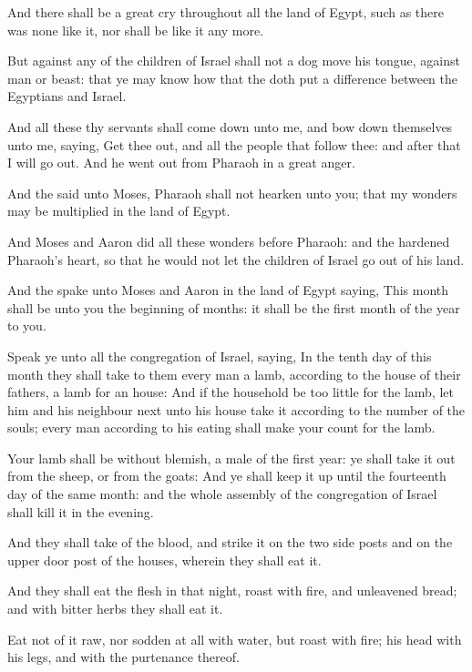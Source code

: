 \Verse And there shall be a great cry throughout all the land of Egypt, such as there was none like it, nor shall be like it any more.

\Verse But against any of the children of Israel shall not a dog move his tongue, against man or beast: that ye may know how that the \LORD doth put a difference between the Egyptians and Israel.

\Verse And all these thy servants shall come down unto me, and bow down themselves unto me, saying, Get thee out, and all the people that follow thee: and after that I will go out. And he went out from Pharaoh in a great anger.

\Verse And the \LORD said unto Moses, Pharaoh shall not hearken unto you; that my wonders may be multiplied in the land of Egypt.

\Verse And Moses and Aaron did all these wonders before Pharaoh: and the \LORD hardened Pharaoh's heart, so that he would not let the children of Israel go out of his land.

\Chapter
\Verse And the \LORD spake unto Moses and Aaron in the land of Egypt saying, \Verse This month shall be unto you the beginning of months: it shall be the first month of the year to you.

\Verse Speak ye unto all the congregation of Israel, saying, In the tenth day of this month they shall take to them every man a lamb, according to the house of their fathers, a lamb for an house: \Verse And if the household be too little for the lamb, let him and his neighbour next unto his house take it according to the number of the souls; every man according to his eating shall make your count for the lamb.

\Verse Your lamb shall be without blemish, a male of the first year: ye shall take it out from the sheep, or from the goats: \Verse And ye shall keep it up until the fourteenth day of the same month: and the whole assembly of the congregation of Israel shall kill it in the evening.

\Verse And they shall take of the blood, and strike it on the two side posts and on the upper door post of the houses, wherein they shall eat it.

\Verse And they shall eat the flesh in that night, roast with fire, and unleavened bread; and with bitter herbs they shall eat it.

\Verse Eat not of it raw, nor sodden at all with water, but roast with fire; his head with his legs, and with the purtenance thereof.

